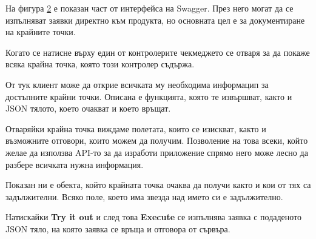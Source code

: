 На фигура \ref{fig:swagger_ui} е показан част от интерфейса на Swagger. През него могат да се изпълняват заявки директно към продукта, но основната цел е за документиране на крайните точки.

Когато се натисне върху един от контролерите чекмеджето се отваря за да покаже всяка крайна точка, която този контролер съдържа. 

\begin{figure}[h]
    \centering
    \caption{}
    \label{fig:swagger_users}
\end{figure}

От тук клиент може да открие всичката му необходима информацип за достъпните крайни точки. Описана е функцията, която те извършват, както и JSON тялото, което очакват и което връщат.

Отваряйки крайна точка виждаме полетата, които се изискват, както и възможните отговори, които можем да получим. Позволение на това всеки, който желае да използва API-то за да изработи приложение спрямо него може лесно да разбере всичката нужна информация.

\begin{figure}[h]
    \centering
    \caption{}
    \label{fig:swagger_ui}
\end{figure}

Показан ни е обекта, който крайната точка очаква да получи както и кои от тях са задължителни. Всяко поле, което има звезда над името си е задължително.

Натискайки \textbf{Try it out} и след това \textbf{Execute} се изпълнява заявка с подаденото JSON тяло, на която заявка се връща и отговора от сървъра.